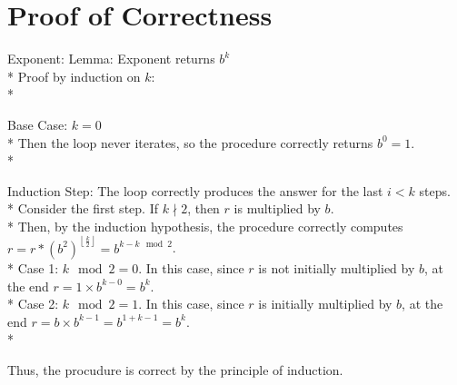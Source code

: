 \documentclass[letterpaper, reqno, 11pt]{article}
\begin{document}
\section*{Proof of Correctness}
\begin{description}
	\item{Exponent:}
	Lemma: Exponent returns $b^k$\\*
	Proof by induction on $k$:\\*
	\begin{description}
		\item{Base Case:} $k=0$\\*
		Then the loop never iterates, so the procedure correctly returns $b^0=1$.\\*
		\item{Induction Step:} The loop correctly produces the answer for the last $i<k$ steps.\\*
		Consider the first step. If $k\nmid 2$, then $r$ is multiplied by $b$.\\*
		Then, by the induction hypothesis, the procedure correctly computes
		$r=r*(b^2)^{\left\lfloor\frac{k}{2}\right\rfloor}=b^{k-k\mod2}$.\\*
		Case 1: $k\mod 2=0$. In this case, since $r$ is not initially multiplied by $b$,
			at the end $r=1\times b^{k-0}=b^k$.\\*
		Case 2:	$k\mod 2=1$. In this case, since $r$ is initially multiplied by $b$,
			at the end $r=b\times b^{k-1}=b^{1+k-1}=b^k$.\\*
	\end{description}
	Thus, the procudure is correct by the principle of induction.


\end{description}
\end{document}
